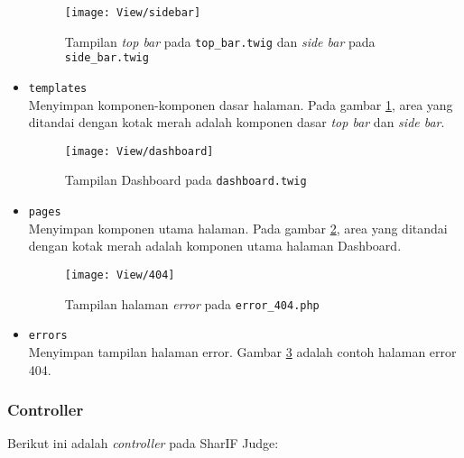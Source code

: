 \begin{itemize}
    \begin{figure}[H]
    	\centering
    	\texttt{[image: View/sidebar]}  
    	\caption{Tampilan \textit{top bar} pada \texttt{top\_bar.twig} dan \textit{side bar} pada \texttt{side\_bar.twig}}
    	\label{fig:3:viewsidebar} 
    \end{figure} 
    \item \verb|templates| \\ Menyimpan komponen-komponen dasar halaman. Pada gambar \ref{fig:3:viewsidebar}, area yang ditandai dengan kotak merah adalah komponen dasar \textit{top bar} dan \textit{side bar}.
    
    \begin{figure}[H]
    	\centering  
    	\texttt{[image: View/dashboard]}  
    	\caption{Tampilan Dashboard pada \texttt{dashboard.twig}}
    	\label{fig:3:viewsubmit} 
    \end{figure} 
    \item \verb|pages| \\ Menyimpan komponen utama halaman. Pada gambar \ref{fig:3:viewsubmit}, area yang ditandai dengan kotak merah adalah komponen utama halaman Dashboard.
    
    \begin{figure}[H]
    	\centering  
    	\texttt{[image: View/404]}  
    	\caption{Tampilan halaman \textit{error} pada \texttt{error\_404.php}}
    	\label{fig:3:view404} 
    \end{figure} 
	\item \verb|errors| \\ Menyimpan tampilan halaman error. Gambar \ref{fig:3:view404} adalah contoh halaman error 404.
\end{itemize}

\subsubsection{Controller}

Berikut ini adalah \textit{controller} pada SharIF Judge:

